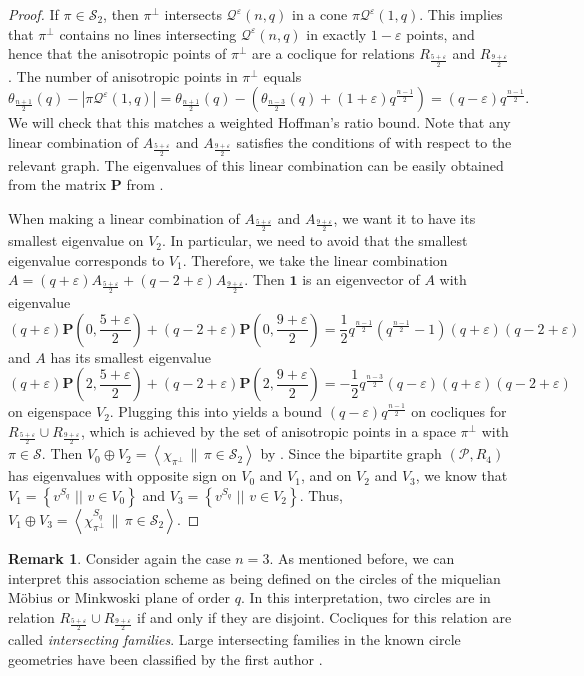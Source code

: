 \documentclass[a4paper]{article}
\theoremstyle{definition}
\newtheorem{rmk}[thm]{Remark}
\newcommand{\eps}{\varepsilon}
\newcommand{\vspann}[2]{\left \langle #1 \, \| \, #2 \right \rangle}
\newcommand{\sett}[2]{ \left\{ #1 \, \, || \, \, #2 \right \} }
\newcommand{\one}{\mathbf 1}
\newcommand{\pp}{\mathcal P}
\newcommand{\mq}{\mathcal Q}
\newcommand{\ms}{\mathcal S}
\begin{document}
\begin{proof}
 If $\pi \in \ms_2$, then $\pi^\perp$ intersects $\mq^\eps(n,q)$ in a cone $\pi \mq^\eps(1,q)$.
 This implies that $\pi^\perp$ contains no lines intersecting $\mq^\eps(n,q)$ in exactly $1-\eps$ points, and hence that the anisotropic points of $\pi^\perp$ are a coclique for relations $R_{\frac{5+\eps}2}$ and $R_{\frac{9+\eps}{2}}$.
 The number of anisotropic points in $\pi^\perp$ equals
 \[
  \theta_{\frac{n+1}2}(q) - |\pi \mq^\eps(1,q)|
  = \theta_{\frac{n+1}2}(q) - \left( \theta_{\frac{n-3}2}(q) + (1+\eps) q^\frac{n-1}2 \right)
  = (q-\eps) q^\frac{n-1}2.
 \]
 We will check that this matches a weighted Hoffman's ratio bound.
 Note that any linear combination of $A_{\frac{5+\eps}2}$ and $A_{\frac{9+\eps}2}$ satisfies the conditions of  with respect to the relevant graph.
 The eigenvalues of this linear combination can be easily obtained from the matrix $\mathbf P$ from .

 When making a linear combination of $A_{\frac{5+\eps}2}$ and $A_{\frac{9+\eps}2}$, we want it to have its smallest eigenvalue on $V_2$.
 In particular, we need to avoid that the smallest eigenvalue corresponds to $V_1$.
 Therefore, we take the linear combination $A = (q+\eps) A_{\frac{5+\eps}2} + (q-2+\eps) A_{\frac{9+\eps}2}$.
 Then $\one$ is an eigenvector of $A$ with eigenvalue
 \[
  (q+\eps) \mathbf P\left(0,\frac{5+\eps}2\right) + (q-2+\eps) \mathbf P\left(0,\frac{9+\eps}2\right)
  = \frac 12 q^\frac{n-1}2 \left( q^\frac{n-1}2 - 1 \right) (q+\eps) (q-2+\eps)
 \]
 and $A$ has its smallest eigenvalue
 \[
  (q+\eps) \mathbf P\left(2,\frac{5+\eps}2\right) + (q-2+\eps) \mathbf P\left(2,\frac{9+\eps}2\right)
  = - \frac 12 q^\frac{n-3}2 (q-\eps) (q+\eps) (q-2+\eps)
 \]
 on eigenspace $V_2$.
 Plugging this into  yields a bound $(q-\eps) q^\frac{n-1}2$ on cocliques for $R_{\frac{5+\eps}2} \cup R_{\frac{9+\eps}2}$, which is achieved by the set of anisotropic points in a space $\pi^\perp$ with $\pi \in \ms$.
 Then $V_0 \oplus V_2 = \vspann{\chi_{\pi^\perp}}{\pi \in \ms_2}$ by .
 Since the bipartite graph $(\pp,R_4)$ has eigenvalues with opposite sign on $V_0$ and $V_1$, and on $V_2$ and $V_3$, we know that $V_1 = \sett{v^{S_q}}{v \in V_0}$ and $V_3 = \sett{v^{S_q}}{v \in V_2}$.
 Thus, $V_1 \oplus V_3 = \vspann{\chi_{\pi^\perp}^{S_q}}{\pi \in \ms_2}$.
\end{proof}

\begin{rmk}
 Consider again the case $n=3$.
 As mentioned before, we can interpret this association scheme as being defined on the circles of the miquelian Möbius or Minkwoski plane of order $q$.
 In this interpretation, two circles are in relation $R_\frac{5+\eps}2 \cup R_\frac{9+\eps}2$ if and only if they are disjoint.
 Cocliques for this relation are called \emph{intersecting families}.
 Large intersecting families in the known circle geometries have been classified by the first author \cite[Theorem 1.3]{adriaensen2022stability}.
\end{rmk}
\end{document}
